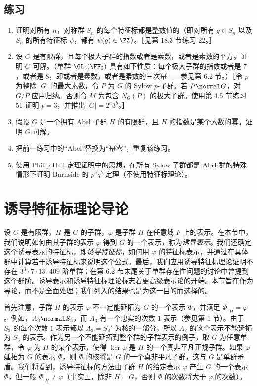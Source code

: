 \subsection*{练习}
\begin{enumerate}[label=\arabic*.]
  \item 证明对所有 $n$，对称群 $S_n$ 的每个特征标都是整数值的（即对所有 $g\in S_n$ 以及 $S_n$ 的所有特征标 $\psi$，都有 $\psi(g)\in\ZZ$）。［见第 18.3 节练习 22。］
  \item 设 $G$ 是有限群，且每个极大子群的指数或者是素数，或者是素数的平方。证明 $G$ 可解。（单群 $\GL_3(\FF_2)$ 具有如下性质：每个极大子群的指数或者是 $7$，或者是 $8$，即或者是素数，或者是素数的三次幂——参见第 6.2 节。）［令 $p$ 为整除 $|G|$ 的最大素数，令 $P$ 为 $G$ 的 Sylow $p$-子群。若 $P\normal G$，对 $G/P$ 应用归纳。否则令 $M$ 为包含 $N_G(P)$ 的极大子群。使用第 4.5 节练习 51 证明 $p=3$，并推出 $|G|=2^a3^b$。］
  \item 假设 $G$ 是一个拥有 Abel 子群 $H$ 的有限群，且 $H$ 的指数是某个素数的幂。证明 $G$ 可解。
  \item 把前一练习中的“Abel”替换为“幂零”，重复该练习。
  \item 使用 Philip Hall 定理证明中的思想，在所有 Sylow 子群都是 Abel 群的特殊情形下证明 Burnside 的 $p^a q^b$ 定理（不使用特征标理论）。
\end{enumerate}

\section{诱导特征标理论导论}

设 $G$ 是有限群，$H$ 是 $G$ 的子群，$\varphi$ 是子群 $H$ 在任意域 $F$ 上的表示。在本节中，我们说明如何由其子群的表示 $\varphi$ 得到 $G$ 的一个表示，称为\emph{诱导表示}。我们还确定这个诱导表示的特征标，即\emph{诱导特征标}，如何用 $\varphi$ 的特征标表示，并通过在具体群中计算若干诱导特征标来说明这个公式。最后，我们应用诱导特征标理论证明不存在 $3^3\cdot7\cdot13\cdot409$ 阶单群；在第 6.2 节末尾关于单群存在性问题的讨论中曾提到这个群阶。诱导表示和诱导特征标理论标志着更高级表示论的开端。本节旨在作为导论，而不是全面处理；我们列入的结果也是为这一目的而选择的。

首先注意，子群 $H$ 的表示 $\varphi$ 不一定能延拓为 $G$ 的一个表示 $\Phi$，并满足 $\Phi|_H=\varphi$。例如，$A_3\normal S_3$，而 $A_3$ 有一个忠实的次数 $1$ 表示（参见第 1 节）。由于 $S_3$ 的每个次数 $1$ 表示都以 $A_3=S_3'$ 为核的一部分，所以 $A_3$ 的这个表示不能延拓为 $S_3$ 的表示。作为另一个不能延拓到整个群的子群表示的例子，取 $G$ 为任意单群，令 $\varphi$ 为 $H$ 的某个表示，使得 $\ker\varphi$ 是 $H$ 的一个真非平凡正规子群。如果 $\varphi$ 延拓为 $G$ 的表示 $\Phi$，则 $\Phi$ 的核将是 $G$ 的一个真非平凡子群，这与 $G$ 是单群矛盾。我们将看到，诱导特征标的方法由子群 $H$ 的给定表示 $\varphi$ 产生 $G$ 的一个表示 $\Phi$，但一般 $\Phi|_H\neq\varphi$（事实上，除非 $H=G$，否则 $\Phi$ 的次数将大于 $\varphi$ 的次数）。

